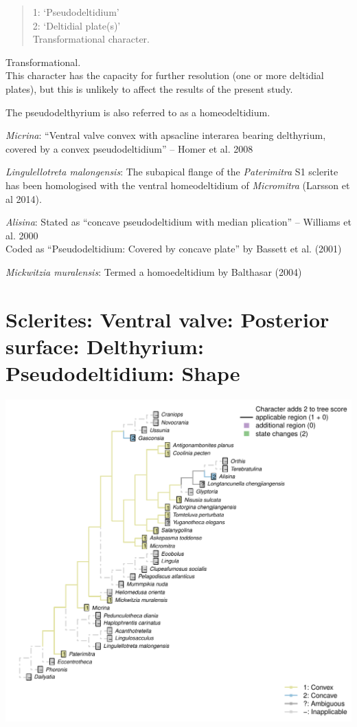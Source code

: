 \documentclass[]{book}
\theoremstyle{definition}
\theoremstyle{definition}
\theoremstyle{definition}
\theoremstyle{remark}
\begin{document}
\begin{quote}
1: `Pseudodeltidium'\\
2: `Deltidial plate(s)'\\
Transformational character.
\end{quote}

Transformational.\\
This character has the capacity for further resolution (one or more
deltidial plates), but this is unlikely to affect the results of the
present study.

The pseudodelthyrium is also referred to as a homeodeltidium.

\emph{Micrina}: ``Ventral valve convex with apsacline interarea bearing
delthyrium, covered by a convex pseudodeltidium'' -- Homer et al. 2008

\emph{Lingulellotreta malongensis}: The subapical flange of the
\emph{Paterimitra} S1 sclerite has been homologised with the ventral
homeodeltidium of \emph{Micromitra} (Larsson et al 2014).

\emph{Alisina}: Stated as ``concave pseudodeltidium with median
plication'' -- Williams et al. 2000\\
Coded as ``Pseudodeltidium: Covered by concave plate'' by Bassett et al.
(2001)

\emph{Mickwitzia muralensis}: Termed a homoedeltidium by Balthasar
(2004)

\hypertarget{sclerites-ventral-valve-posterior-surface-delthyrium-pseudodeltidium-shape}{%
\section*{Sclerites: Ventral valve: Posterior surface: Delthyrium:
Pseudodeltidium:
Shape}\label{sclerites-ventral-valve-posterior-surface-delthyrium-pseudodeltidium-shape}}

\includegraphics{Brachiopod_phylogeny_files/figure-latex/unnamed-chunk-5-40.pdf}
\end{document}
